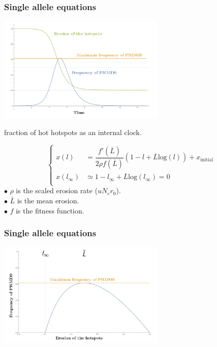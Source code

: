 \documentclass[10pt]{beamer}
\begin{document}
\begin{frame}
\frametitle{Single allele equations}
	\begin{center}
       \includegraphics[width=8cm]{Images/single-allele-differential.png}
	\end{center}
\end{frame}

\begin{frame}
	\begin{center}
		\Large
    	fraction of hot hotspots as an internal clock.
	\end{center}
\[
  \left\{
      \begin{aligned}
          x(l) &=\dfrac{f'(\overline{L})}{2 \rho f(\overline{L})} (1-l + \overline{L} \mathrm{log}(l)) + x_{\mathrm{initial}} \\
           x(l_{\infty}) & \simeq  1-l_{\infty} + \overline{L} \mathrm{log}(l_{\infty}) = 0  \\
      \end{aligned}
    \right.
\]
		$\bullet$ $\rho$ is the scaled erosion rate ($u N_e r_0$). \\
		$\bullet$ $\bar{L}$ is the mean erosion. \\
		$\bullet$ $f$ is the fitness function. \\
\end{frame}

\begin{frame}
\frametitle{Single allele equations}
	\begin{center}
       \includegraphics[width=8cm]{Images/single-allele.png}
	\end{center}
\end{frame}
\end{document}
